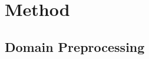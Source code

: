 \documentclass[letterpaper,journal]{IEEEtran}
\begin{document}
\section{Method}
\label{sec:method}


\subsection{Domain Preprocessing}
\label{subsec:preprocessing}
\end{document}
